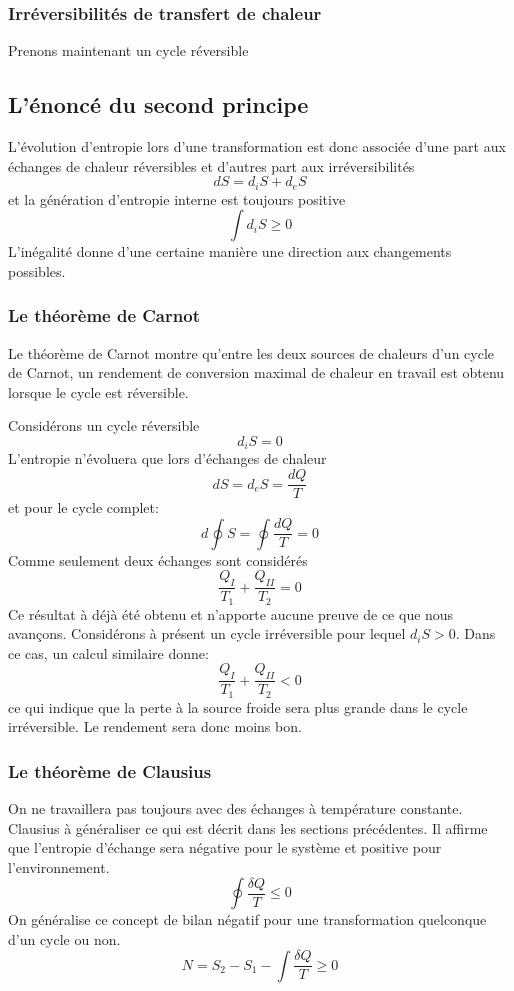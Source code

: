 \subsubsection{Irréversibilités de transfert de chaleur}
Prenons maintenant un cycle réversible

\subsection{L'énoncé du second principe}
L'évolution d'entropie lors d'une transformation est
donc associée d'une part aux échanges de chaleur réversibles et
d'autres part aux irréversibilités
\[ dS = d_iS+d_eS \]
et la génération d'entropie interne est toujours positive
\[ \int d_iS \geqslant 0  \]
L'inégalité donne d'une certaine manière une direction
aux changements possibles.

\subsubsection{Le théorème de Carnot}
Le théorème de Carnot montre qu'entre les deux sources de chaleurs
d'un cycle de Carnot, un rendement de conversion  maximal de chaleur
en travail est obtenu lorsque le cycle est réversible.

Considérons un cycle réversible
\[ d_iS = 0 \]
L'entropie n'évoluera que lors d'échanges de chaleur
\[ dS = d_eS = \frac{dQ}T \]
et pour le cycle complet:
\[ d\oint S = \oint \frac {dQ}{T} = 0 \]
Comme seulement deux échanges sont considérés
\[ \frac{Q_I}{T_1}+\frac{Q_{II}}{T_2} = 0 \]
Ce résultat à déjà été obtenu et n'apporte aucune preuve
de ce que nous avançons.
Considérons à présent un cycle irréversible pour lequel $d_iS > 0$.
Dans ce cas, un calcul similaire donne:
\[ \frac{Q_I}{T_1}+\frac{Q_{II}}{T_2} < 0 \]
ce qui indique que la perte à la source froide sera
plus grande dans le cycle irréversible.
Le rendement sera donc moins bon.

\subsubsection{Le théorème de Clausius}
On ne travaillera pas toujours avec des échanges à température constante.
Clausius à généraliser ce qui est décrit dans les sections précédentes.
Il affirme que l'entropie d'échange sera négative pour le système et
positive pour l'environnement.
\[ \oint \frac{\delta Q}T \leqslant 0  \]
On généralise ce concept de bilan négatif pour
une transformation quelconque d'un cycle ou non.
\[ N = S_2-S_1-\int \frac{\delta Q}T \geqslant0 \]

